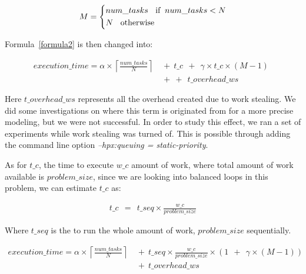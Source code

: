 \begin{equation}\label{formula19}
M=\left\{
\begin{aligned}
&num\_{tasks} \text{\:\:\:\:if \:} num\_{tasks}<N\\
&N \text{\:\:\:\:otherwise}
\end{aligned}
\right.
\end{equation}


Formula~\ref{formula2} is then changed into:

\begin{equation}\label{formula1}
\begin{aligned}
execution\_time = 
\alpha\times{\left\lceil{\frac{num\_{tasks}}{N}}\right\rceil}\:\:&+\:\:t\_c\:\:+\:\:\gamma\times{t\_c}\times{(M-1)}\:\:\\
&+\:\:+\:\:t\_{overhead\_{ws}}
\end{aligned}
\end{equation}

Here $t\_{overhead\_{ws}}$ represents all the overhead created due to work stealing. We did some investigations on where this term is originated from for a more precise modeling, but we were not successful. In order to study this effect, we ran a set of experiments while work stealing was turned of. This is possible through adding the command line option \emph{--hpx:queuing = static-priority}.

As for $t\_{c}$, the time to execute $w\_{c}$ amount of work, where total amount of work available is $problem\_{size}$, since we are looking into balanced loops in this problem, we can estimate $t\_{c}$ as:

\begin{equation}\label{formula41}
\begin{aligned}
t\_{c}\:\:=\:\:t\_{seq}\times{\frac{w\_c}{problem\_{size}}}
\end{aligned}
\end{equation}

Where $t\_{seq}$ is the to run the whole amount of work, $problem\_{size}$ sequentially.

\begin{equation}\label{formula42}
\begin{aligned}
execution\_time = 
\alpha\times{\left\lceil{\frac{num\_{tasks}}{N}}\right\rceil}\:\:&+\:\:t\_{seq}\times{\frac{w\_c}{problem\_{size}}}\times{(1\:\:+\:\:\gamma\times{(M-1)})}\:\:\\
&+\:\:t\_{overhead\_{ws}}\\
\end{aligned}
\end{equation}


